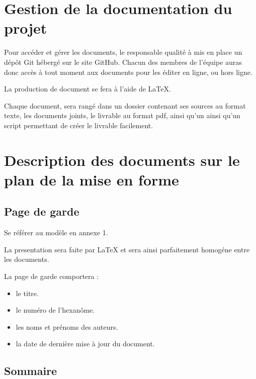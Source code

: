 \section{Gestion de la documentation du projet}

Pour accéder et gérer les documents, le responsable qualité à mis en place un dépôt Git hébergé sur le site GitHub.
Chacun des membres de l’équipe auras donc accès à tout moment aux documents pour les éditer en ligne, ou hors ligne.

La production de document se fera à l’aide de LaTeX.

Chaque document, sera rangé dans un dossier contenant ses sources au format texte, les documents joints, le livrable au format pdf, ainsi qu'un  ainsi qu'un script  permettant de créer le livrable facilement.

\section{Description des documents sur le plan de la mise en forme}



\subsection{Page de garde}
   Se référer au modèle en annexe 1.

   La presentation sera faite par LaTeX et sera ainsi parfaitement homogéne entre les documents.

   La page de garde comportera :
   \begin{itemize}
      \item le titre.
      \item le numéro de l'hexanôme.
      \item les noms et prénoms des auteurs.
      \item la date de dernière mise à jour du document.
   \end{itemize}

\subsection{Sommaire}
  
